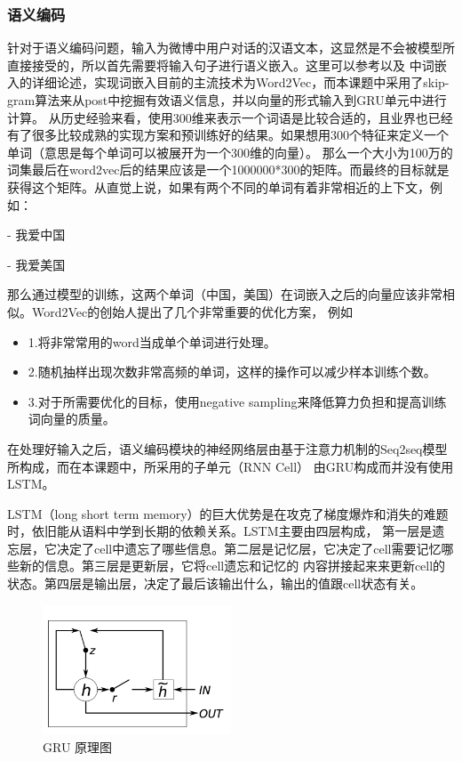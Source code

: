 \documentclass[supercite]{HustGraduPaper}
\theoremstyle{definition}
\begin{document}
\subsubsection{语义编码}
针对于语义编码问题，输入为微博中用户对话的汉语文本，这显然是不会被模型所直接接受的，所以首先需要将输入句子进行语义嵌入。这里可以参考\cite{mikolov2013efficient}以及
\cite{wordvector}中词嵌入的详细论述，实现词嵌入目前的主流技术为Word2Vec，而本课题中采用了skip-gram算法来从post中挖掘有效语义信息，并以向量的形式输入到GRU单元中进行计算。
从历史经验来看，使用300维来表示一个词语是比较合适的，且业界也已经有了很多比较成熟的实现方案和预训练好的结果。如果想用300个特征来定义一个单词（意思是每个单词可以被展开为一个300维的向量）。
那么一个大小为100万的词集最后在word2vec后的结果应该是一个1000000*300的矩阵。而最终的目标就是获得这个矩阵。从直觉上说，如果有两个不同的单词有着非常相近的上下文，例如：
\begin{shaded*}
  - 我爱中国

  - 我爱美国
\end{shaded*}


那么通过模型的训练，这两个单词（中国，美国）在词嵌入之后的向量应该非常相似。Word2Vec的创始人提出了几个非常重要的优化方案，
例如
\begin{itemize}
  \item 1.将非常常用的word当成单个单词进行处理。
  \item 2.随机抽样出现次数非常高频的单词，这样的操作可以减少样本训练个数。
  \item 3.对于所需要优化的目标，使用negative sampling来降低算力负担和提高训练词向量的质量。
\end{itemize}


在处理好输入之后，语义编码模块的神经网络层由基于注意力机制的Seq2seq模型所构成，而在本课题中，所采用的子单元（RNN Cell）
由GRU构成而并没有使用LSTM。

LSTM\cite{gers1999learning}（long short term memory）的巨大优势是在攻克了梯度爆炸和消失的难题时，依旧能从语料中学到长期的依赖关系。LSTM主要由四层构成，
第一层是遗忘层，它决定了cell中遗忘了哪些信息。第二层是记忆层，它决定了cell需要记忆哪些新的信息。第三层是更新层，它将cell遗忘和记忆的
内容拼接起来来更新cell的状态。第四层是输出层，决定了最后该输出什么，输出的值跟cell状态有关。

\begin{figure}[H] %
  \centering %
  \includegraphics[width=0.5\textwidth]{images/GRU.png} %
  \caption{GRU 原理图} %
  \label{Fig.GRU} %
\end{figure}
\end{document}
